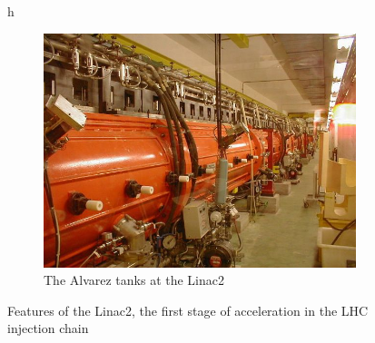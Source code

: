 \begin{figure}{h}
      \begin{subfigure}[h]{0.4\textwidth}
        \includegraphics[width=\textwidth]{Figures/LHC_Diagrams/LHC__Linac2__AlvarezTubes.jpg}
        \caption{The Alvarez tanks at the Linac2 \cite{LHC:LHC_linac2_alvarezChambers_image}}\label{fig:alvarez_tank_actual}
      \end{subfigure}
      \caption{Features of the Linac2, the first stage of
        acceleration in the LHC injection chain} \label{fig:linac2}
\end{figure}


